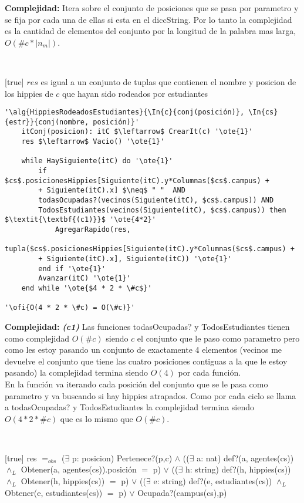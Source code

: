 \textbf{Complejidad:} Itera sobre el conjunto de posiciones que se pasa por parametro y se fija por cada una de ellas si esta en el diccString. Por lo tanto la complejidad es la cantidad de elementos del conjunto por la longitud de la palabra mas larga, $O(\#c * |n_m|)$.

~


[true]
{$res$ es igual a un conjunto de tuplas que contienen el nombre y posicion de los hippies de $c$ que hayan sido rodeados por estudiantes}

\begin{lstlisting}[mathescape]
'\alg{HippiesRodeadosEstudiantes}{\In{c}{conj(posición)}, \In{cs}{estr}}{conj(nombre, posición)}'
	itConj(posicion): itC $\leftarrow$ CrearIt(c) '\ote{1}'
	res $\leftarrow$ Vacio() '\ote{1}'

	while HaySiguiente(itC) do '\ote{1}'
		if $cs$.posicionesHippies[Siguiente(itC).y*Columnas($cs$.campus) +
		+ Siguiente(itC).x] $\neq$ " "  AND
		todasOcupadas?(vecinos(Siguiente(itC), $cs$.campus)) AND
		TodosEstudiantes(vecinos(Siguiente(itC), $cs$.campus)) then $\textit{\textbf{(c1)}}$ '\ote{4*2}'
			AgregarRapido(res,
				tupla($cs$.posicionesHippies[Siguiente(itC).y*Columnas($cs$.campus) +
		+ Siguiente(itC).x], Siguiente(itC)) '\ote{1}'
		end if '\ote{1}'
		Avanzar(itC) '\ote{1}'
	end while '\ote{$4 * 2 * \#c$}'

'\ofi{O(4 * 2 * \#c) = O(\#c)}'
\end{lstlisting}

\textbf{Complejidad:} \textit{\textbf{(c1)}} Las funciones todasOcupadas? y TodosEstudiantes tienen como complejidad $O(\#c)$ siendo $c$ el conjunto que le paso como parametro pero como les estoy pasando un conjunto de exactamente 4 elementos (vecinos me devuelve el conjunto que tiene las cuatro posiciones contiguas a la que le estoy pasando) la complejidad termina siendo $O(4)$ por cada función. \\
En la función va iterando cada posición del conjunto que se le pasa como parametro y va buscando si hay hippies atrapados. Como por cada ciclo se llama a todasOcupadas? y TodosEstudiantes la complejidad termina siendo $O(4 * 2 * \#c)$ que es lo mismo que $O(\#c)$.

~


[true]
{res $=_{obs}$ ($\exists$ p: posicion) Pertenece?(p,c) $\land$ (($\exists$ a: nat) def?(a, agentes(cs)) $\land_L$ Obtener(a, agentes(cs)).posición $=$ p) $\lor$ (($\exists$ h: string) def?(h, hippies(cs)) $\land_L$ Obtener(h, hippies(cs)) $=$ p) $\lor$ (($\exists$ e: string) def?(e, estudiantes(cs)) $\land_L$ Obtener(e, estudiantes(cs)) $=$ p) $\lor$ Ocupada?(campus(cs),p)}

